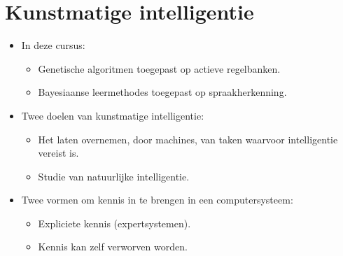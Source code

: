 \chapter{Kunstmatige intelligentie}


	\begin{itemize}
		\item In deze cursus:
		\begin{itemize}
			\item Genetische algoritmen toegepast op actieve regelbanken.
			\item Bayesiaanse leermethodes toegepast op spraakherkenning.
		\end{itemize}
		\item Twee doelen van kunstmatige intelligentie:
			\begin{itemize}
			\item Het laten overnemen, door machines, van taken waarvoor intelligentie vereist is.
			\item Studie van natuurlijke intelligentie.
			\end{itemize}
		\item Twee vormen om kennis in te brengen in een computersysteem:
			\begin{itemize}
				\item Expliciete kennis (expertsystemen).
				\item Kennis kan zelf verworven worden.
			\end{itemize}
	\end{itemize}
